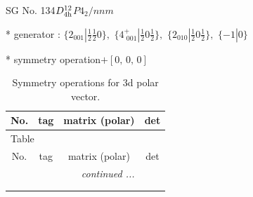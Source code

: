\documentclass[fleqn,8pt]{jsarticle}
\begin{document}
\setcounter{MaxMatrixCols}{32}

\renewcommand{\tablename}{Table~}
\renewcommand{\figurename}{Figure~}
\begin{center}
\LARGE
SG No. 134\quad$D_{\rm 4h}^{12}$\quad$P4_2/nnm$\quad[ tetragonal ]
\end{center}

* generator : $\{2{}_{001}|\frac{1}{2} \frac{1}{2} 0\},\,\,\{4^{+}_{\,\,001}|\frac{1}{2} 0 \frac{1}{2}\},\,\,\{2{}_{010}|\frac{1}{2} 0 \frac{1}{2}\},\,\,\{-1|0\}$

* symmetry operation\quad$+\left[ 0,\, 0,\, 0 \right]$
\renewcommand{\arraystretch}{1.3}
\begin{longtable}{cccc}
\caption{Symmetry operations for 3d polar vector.}
 \\
 \hline \hline
No. & tag & matrix (polar) & det \\ \hline \endfirsthead

\multicolumn{3}{l}{\tablename\ \thetable{}} \\
 \hline \hline
No. & tag & matrix (polar) & det \\ \hline \endhead

 \hline \hline
\multicolumn{3}{r}{\footnotesize\it continued ...} \\ \endfoot

 \hline \hline
\multicolumn{3}{r}{} \\ \endlastfoot


\end{longtable}
\end{document}
